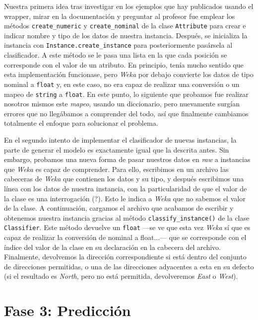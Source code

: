 \documentclass[12pt]{article}
\begin{document}
Nuestra primera idea tras investigar en los ejemplos que hay publicados usando el wrapper, mirar en la documentación y preguntar al profesor fue emplear los métodos \texttt{create\_numeric} y \texttt{create\_nominal} de la clase \texttt{Attribute} para crear e indicar nombre y tipo de los datos de nuestra instancia. Después, se inicializa la instancia con \texttt{Instance.create\_instance} para posteriormente pasársela al clasificador. A este método se le pasa una lista en la que cada posición se corresponde con el valor de un atributo. En principio, tenía mucho sentido que esta implementación funcionase, pero \emph{Weka} por debajo convierte los datos de tipo nominal a \texttt{float} y, en este caso, no era capaz de realizar una conversión o un mapeo de \texttt{string} a \texttt{float}. En este punto, lo siguiente que probamos fue realizar nosotros mismos este \emph{mapeo}, usando un diccionario, pero nuevamente surgían errores que no llegábamos a comprender del todo, así que finalmente cambiamos totalmente el enfoque para solucionar el problema.

En el segundo intento de implementar el clasificador de nuevas instancias, la parte de generar el modelo es exactamente igual que la descrita antes. Sin embargo, probamos una nueva forma de pasar nuestros datos en \emph{raw} a instancias que \emph{Weka} es capaz de comprender. Para ello, escribimos en un archivo las cabeceras de \emph{Weka} que contienen los datos y su tipo, y después escribimos una línea con los datos de nuestra instancia, con la particularidad de que el valor de la clase es una interrogación (?). Esto le indica a \emph{Weka} que no sabemos el valor de la clase. A continuación, cargamos el archivo que acabamos de escribir y obtenemos nuestra instancia gracias al método \texttt{classify\_instance()} de la clase \texttt{Classifier}. Este método devuelve un \texttt{float} ---se ve que esta vez \emph{Weka} sí que es capaz de realizar la conversión de nominal a float...--- que se corresponde con el índice del valor de la clase en su declaración en la cabecera del archivo. Finalmente, devolvemos la dirección correspondiente si está dentro del conjunto de direcciones permitidas, o una de las direcciones adyacentes a esta en su defecto (si el resultado es \emph{North}, pero no está permitida, devolveremos \emph{East} o \emph{West}).

\newpage
\section{Fase 3: Predicción}
\end{document}
